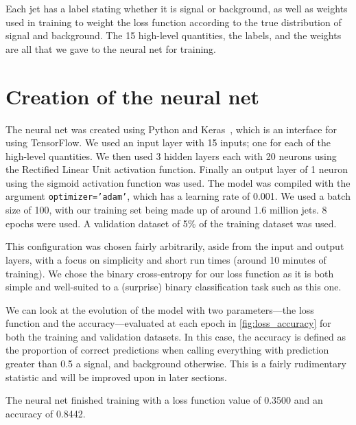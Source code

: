 \documentclass[11pt]{article}
\numberwithin{equation}{section}
\numberwithin{figure}{section}
\numberwithin{table}{section}
\begin{document}
Each jet has a label stating whether it is signal or background, as well as weights used in training to weight the loss function according to the true distribution of signal and background. The 15 high-level quantities, the labels, and the weights are all that we gave to the neural net for training.

\section{Creation of the neural net}\label{sec:CreatingNeuralNet}
The neural net was created using Python and Keras~\cite{keras}, which is an interface for using TensorFlow. We used an input layer with 15 inputs; one for each of the high-level quantities. We then used 3 hidden layers each with 20 neurons using the Rectified Linear Unit activation function. Finally an output layer of 1 neuron using the sigmoid activation function was used. The model was compiled with the argument \texttt{optimizer='adam'}, which has a learning rate of 0.001. We used a batch size of 100, with our training set being made up of around 1.6 million jets. 8 epochs were used. A validation dataset of 5\% of the training dataset was used.

This configuration was chosen fairly arbitrarily, aside from the input and output layers, with a focus on simplicity and short run times (around 10 minutes of training). We chose the binary cross-entropy for our loss function as it is both simple and well-suited to a (surprise) binary classification task such as this one.

We can look at the evolution of the model with two parameters---the loss function and the accuracy---evaluated at each epoch in \cref{fig:loss_accuracy} for both the training and validation datasets. In this case, the accuracy is defined as the proportion of correct predictions when calling everything with prediction greater than 0.5 a signal, and background otherwise. This is a fairly rudimentary statistic and will be improved upon in later sections.

The neural net finished training with a loss function value of \num{0.3500} and an accuracy of \num{0.8442}.
\end{document}
